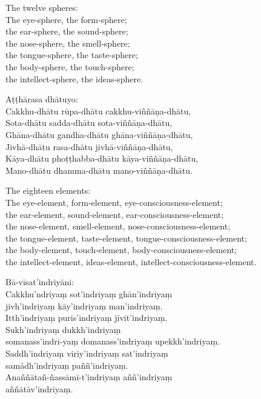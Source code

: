 \begin{english}
  The twelve spheres:\\
  The eye-sphere, the form-sphere;\\
  the ear-sphere, the sound-sphere;\\
  the nose-sphere, the smell-sphere;\\
  the tongue-sphere, the taste-sphere;\\
  the body-sphere, the touch-sphere;\\
  the intellect-sphere, the ideas-sphere.
\end{english}

Aṭṭhārasa dhātuyo:\\
Cakkhu-dhātu rūpa-dhātu cakkhu-viññāṇa-dhātu,\\
Sota-dhātu sadda-dhātu sota-viññāṇa-dhātu,\\
Ghāna-dhātu gandha-dhātu ghāna-viññāṇa-dhātu,\\
Jivhā-dhātu rasa-dhātu jivhā-viññāṇa-dhātu,\\
Kāya-dhātu phoṭṭhabba-dhātu kāya-viññāṇa-dhātu,\\
Mano-dhātu dhamma-dhātu mano-viññāṇa-dhātu.

\begin{english}
  The eighteen elements:\\
  The eye-element, form-element, eye-consciousness-element;\\
  the ear-element, sound-element, ear-consciousness-element;\\
  the nose-element, smell-element, nose-consciousness-element;\\
  the tongue-element, taste-element, tongue-consciousness-element;\\
  the body-element, touch-element, body-consciousness-element;\\
  the intellect-element, ideas-element, intellect-consciousness-element.
\end{english}

Bā-vīsat'indriyāni:\\
Cakkhu'ndriyaṃ sot'indriyaṃ ghān'indriyaṃ\\
jivh'indriyaṃ kāy'indriyaṃ man'indriyaṃ.\\
Itth'indriyaṃ puris'indriyaṃ jīvit'indriyaṃ.\\
Sukh'indriyaṃ dukkh'indriyaṃ\\
somanass'indri-yaṃ domanass'indriyaṃ upekkh'indriyaṃ.\\
Saddh'indriyaṃ viriy'indriyaṃ sat'indriyaṃ\\
samādh'indriyaṃ paññ'indriyaṃ.\\
Anaññātañ-ñassāmī-t'indriyaṃ aññ'indriyaṃ\\
aññātāv'indriyaṃ.

